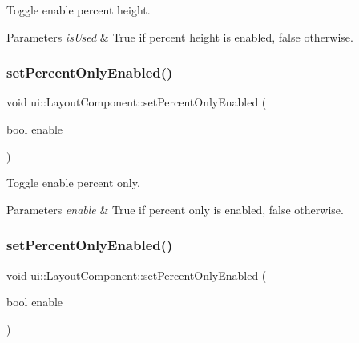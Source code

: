 Toggle enable percent height. 
\begin{DoxyParams}{Parameters}
{\em is\+Used} & True if percent height is enabled, false otherwise. \\
\hline
\end{DoxyParams}
\mbox{\label{classui_1_1LayoutComponent_a8ccc6b1eed66db106bb11906244aad89}} 
\subsubsection{\texorpdfstring{set\+Percent\+Only\+Enabled()}{setPercentOnlyEnabled()}\hspace{0.1cm}{\footnotesize\ttfamily [1/2]}}
{\footnotesize\ttfamily void ui\+::\+Layout\+Component\+::set\+Percent\+Only\+Enabled (\begin{DoxyParamCaption}\item[{bool}]{enable }\end{DoxyParamCaption})}

Toggle enable percent only. 
\begin{DoxyParams}{Parameters}
{\em enable} & True if percent only is enabled, false otherwise. \\
\hline
\end{DoxyParams}
\mbox{\label{classui_1_1LayoutComponent_a8ccc6b1eed66db106bb11906244aad89}} 
\subsubsection{\texorpdfstring{set\+Percent\+Only\+Enabled()}{setPercentOnlyEnabled()}\hspace{0.1cm}{\footnotesize\ttfamily [2/2]}}
{\footnotesize\ttfamily void ui\+::\+Layout\+Component\+::set\+Percent\+Only\+Enabled (\begin{DoxyParamCaption}\item[{bool}]{enable }\end{DoxyParamCaption})}

